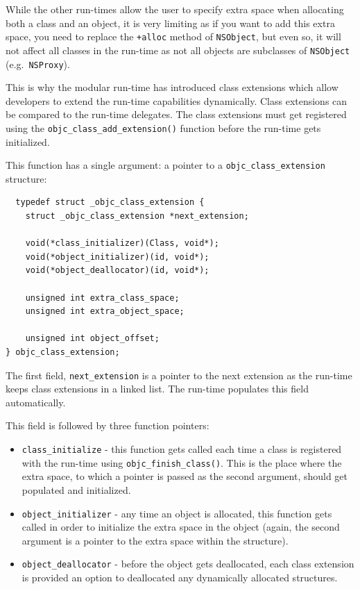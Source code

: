 While the other run-times allow the user to specify extra space when allocating both a class and an object, it is very limiting as if you want to add this extra space, you need to replace the \verb=+alloc= method of \verb=NSObject=, but even so, it will not affect all classes in the run-time as not all objects are subclasses of \verb=NSObject= (e.g.\ \verb=NSProxy=).

This is why the modular run-time has introduced class extensions which allow developers to extend the run-time capabilities dynamically. Class extensions can be compared to the run-time delegates. The class extensions must get registered using the \verb=objc_class_add_extension()= function before the run-time gets initialized.

This function has a single argument: a pointer to a \verb=objc_class_extension= structure:

\begin{verbatim}
  typedef struct _objc_class_extension {
    struct _objc_class_extension *next_extension;

    void(*class_initializer)(Class, void*);
    void(*object_initializer)(id, void*);
    void(*object_deallocator)(id, void*);
	
    unsigned int extra_class_space;
    unsigned int extra_object_space;
	
    unsigned int object_offset;
} objc_class_extension;
\end{verbatim}

The first field, \verb=next_extension= is a pointer to the next extension as the run-time keeps class extensions in a linked list. The run-time populates this field automatically.

This field is followed by three function pointers:

\begin{itemize}
  \item \verb=class_initialize= - this function gets called each time a class is registered with the run-time using \verb=objc_finish_class()=. This is the place where the extra space, to which a pointer is passed as the second argument, should get populated and initialized.
  
  \item \verb=object_initializer= - any time an object is allocated, this function gets called in order to initialize the extra space in the object (again, the second argument is a pointer to the extra space within the structure).
  
  \item \verb=object_deallocator= - before the object gets deallocated, each class   extension is provided an option to deallocated any dynamically allocated structures.
\end{itemize}

